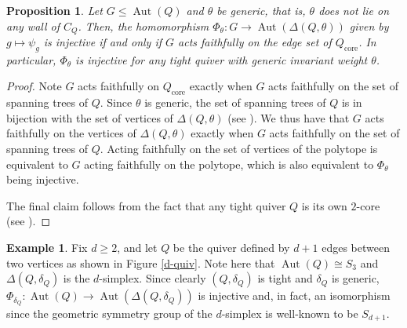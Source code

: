 \documentclass[12pt]{amsart}
\theoremstyle{plain}
\newtheorem{proposition}[theorem]{Proposition}
\theoremstyle{definition}
\newtheorem{example}[theorem]{Example}
\newcommand{\Z}{\mathbb{Z}}
\DeclareMathOperator{\aut}{Aut}
\DeclareMathOperator{\Hom}{Hom}
\renewcommand{\hom}{\Hom}
\begin{document}


\begin{proposition}
     Let $G \leq \aut(Q)$ and $\theta$ be generic, that is, $\theta$ does not lie on any wall of $C_Q$. Then, the homomorphism $\Phi_\theta : G \to \aut(\Delta(Q, \theta))$ given by $g \mapsto \psi_g$ is injective if and only if $G$ acts faithfully on the edge set of $Q_{\text{core}}$. In particular, $\Phi_\theta$ is injective for any tight quiver with generic invariant weight $\theta$.
\end{proposition}

\begin{proof} 
    Note $G$ acts faithfully on $Q_{\text{core}}$ exactly when $G$ acts faithfully on the set of spanning trees of $Q$. Since $\theta$ is generic, the set of spanning trees of $Q$ is in bijection with the set of vertices of $\Delta(Q, \theta)$ (see \cite{hille2003quivers}). We thus have that $G$ acts faithfully on the vertices of $\Delta(Q, \theta)$ exactly when $G$ acts faithfully on the set of spanning trees of $Q$. Acting faithfully on the set of vertices of the polytope is equivalent to $G$ acting faithfully on the polytope, which is also equivalent to $\Phi_\theta$ being injective. 

    The final claim follows from the fact that any tight quiver $Q$ is its own $2$-core (see \cite{domokos2016equations}).
\end{proof}

\begin{example}
    Fix $d \geq 2$, and let $Q$ be the quiver defined by $d+1$ edges between two vertices as shown in Figure \ref{d-quiv}. Note here that $\aut(Q) \cong S_3$ and $\Delta(Q, \delta_Q)$ is the $d$-simplex. Since clearly $(Q, \delta_Q)$ is tight and $\delta_Q$ is generic, $\Phi_{\delta_Q} : \aut(Q) \longrightarrow \aut(\Delta(Q, \delta_Q))$ is injective and, in fact, an isomorphism since the geometric symmetry group of the $d$-simplex is well-known to be $S_{d+1}$.
\end{example}
\end{document}
